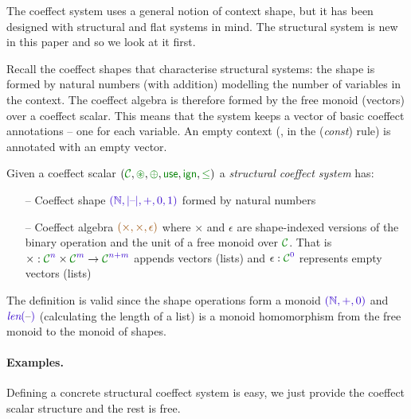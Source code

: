The coeffect system uses a general notion of context shape, but
it has been designed with structural and flat systems in
mind. The structural system is new in this paper and so we
look at it first.

Recall the coeffect shapes that characterise structural systems: the shape is formed by natural
numbers (with addition) modelling the number of variables in the
context. The coeffect algebra is therefore formed by the free monoid
(vectors) over a coeffect scalar. This means that the system keeps a vector
of basic coeffect annotations -- one for each variable. An empty
context (\eg{}, in the (\emph{const}) rule) is annotated with an empty
vector.

\begin{definition}
Given a coeffect scalar $(\C, \cseq, \cpar, \cunit, \czero, \cleq)$ a \emph{structural
coeffect system} has: 
\begin{itemize}{}
\item[--] Coeffect shape $\sclrd{(\mathbb{N}, {|}\textnormal{--}{|}, +, 0, 1)}$ formed by natural numbers
\item[--] Coeffect algebra $\aclrd{(\times, \times, \epsilon)}$ where $\times$ and $\epsilon$ are
  shape-indexed versions of the binary operation and the unit of a free monoid over $\C$.
  That is $\times : \C^{\sclrd{n}} \times \C^{\sclrd{m}} \rightarrow \C^{\sclrd{n + m}}$ appends vectors
  (lists) and $\epsilon : \C^{\sclrd{0}}$ represents empty vectors (lists)
\end{itemize}
\end{definition}

\noindent
The definition is valid since the shape operations form a monoid
$\sclrd{(\mathbb{N}, +, 0)}$ and $\slen{\textnormal{--}}$ (calculating the length of
a list) is a monoid homomorphism from the free monoid to the monoid of
shapes.

\paragraph{Examples.} 
Defining a concrete structural coeffect system is easy, we just provide the coeffect scalar structure and the rest is free.

